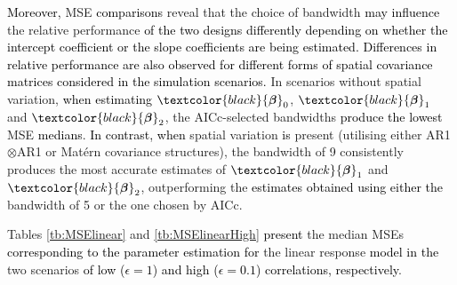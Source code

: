 \documentclass[a4paper]{article} 	%
\newcommand{\Matern}{Mat\'ern }
\newcommand{\revision}[1]{\textcolor{black}{#1}}
\newcommand{\zc}[1]{\textcolor{black}{#1}}
\begin{document}
\revision{Moreover,} MSE \zc{comparisons} reveal that the choice of bandwidth \zc{may influence} the relative performance \revision{of the two designs differently depending on whether the intercept coefficient or the slope coefficients are being estimated. Differences in relative performance are also observed for different forms of spatial covariance matrices considered in the simulation scenarios.}  In scenarios without spatial variation, \revision{when estimating} \zc{$\zc{\bm{\beta}}_0$}, $\zc{\bm{\beta}}_1$ and $\zc{\bm{\beta}}_2$, the AICc-selected bandwidths \revision{produce} \zc{the lowest} MSE \revision{medians}. \zc{In contrast, when} spatial variation \zc{is} present (utilising either AR1$\otimes$AR1 or \Matern covariance structures), the bandwidth of 9 consistently produces the most accurate estimates of $\zc{\bm{\beta}}_1$ and $\zc{\bm{\beta}}_2$, outperforming the \revision{estimates obtained using either the} bandwidth of 5 or the one chosen by AICc. %

Tables \ref{tb:MSElinear} and \ref{tb:MSElinearHigh} \revision{present} the median MSEs \revision{corresponding to the parameter estimation for} the linear response \revision{model in the} two scenarios \revision{of low ($\epsilon=1$) and high ($\epsilon= 0.1$) correlations, respectively}.
\end{document}
